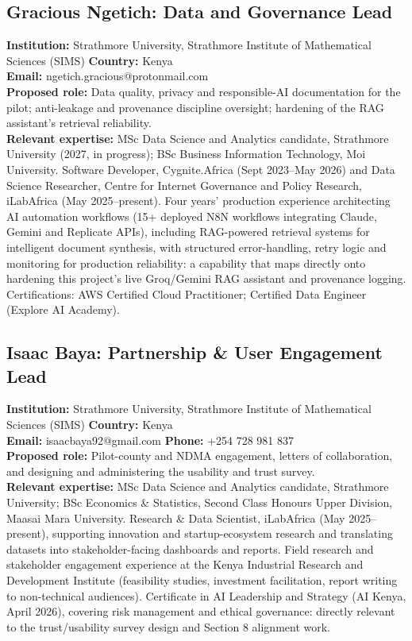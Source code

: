 \documentclass[12pt,a4paper]{article}
\begin{document}
\subsection*{Gracious Ngetich: Data and Governance Lead}
\textbf{Institution:} Strathmore University, Strathmore Institute of Mathematical Sciences (SIMS) \quad \textbf{Country:} Kenya \\
\textbf{Email:} ngetich.gracious@protonmail.com \\
\textbf{Proposed role:} Data quality, privacy and responsible-AI documentation for the pilot; anti-leakage and provenance discipline oversight; hardening of the RAG assistant's retrieval reliability. \\
\textbf{Relevant expertise:} MSc Data Science and Analytics candidate, Strathmore University (2027, in progress); BSc Business Information Technology, Moi University. Software Developer, Cygnite.Africa (Sept 2023--May 2026) and Data Science Researcher, Centre for Internet Governance and Policy Research, iLabAfrica (May 2025--present). Four years' production experience architecting AI automation workflows (15+ deployed N8N workflows integrating Claude, Gemini and Replicate APIs), including RAG-powered retrieval systems for intelligent document synthesis, with structured error-handling, retry logic and monitoring for production reliability: a capability that maps directly onto hardening this project's live Groq/Gemini RAG assistant and provenance logging. Certifications: AWS Certified Cloud Practitioner; Certified Data Engineer (Explore AI Academy).

\subsection*{Isaac Baya: Partnership \& User Engagement Lead}
\textbf{Institution:} Strathmore University, Strathmore Institute of Mathematical Sciences (SIMS) \quad \textbf{Country:} Kenya \\
\textbf{Email:} isaacbaya92@gmail.com \quad \textbf{Phone:} +254 728 981 837 \\
\textbf{Proposed role:} Pilot-county and NDMA engagement, letters of collaboration, and designing and administering the usability and trust survey. \\
\textbf{Relevant expertise:} MSc Data Science and Analytics candidate, Strathmore University; BSc Economics \& Statistics, Second Class Honours Upper Division, Maasai Mara University. Research \& Data Scientist, iLabAfrica (May 2025--present), supporting innovation and startup-ecosystem research and translating datasets into stakeholder-facing dashboards and reports. Field research and stakeholder engagement experience at the Kenya Industrial Research and Development Institute (feasibility studies, investment facilitation, report writing to non-technical audiences). Certificate in AI Leadership and Strategy (AI Kenya, April 2026), covering risk management and ethical governance: directly relevant to the trust/usability survey design and Section 8 alignment work.
\end{document}
